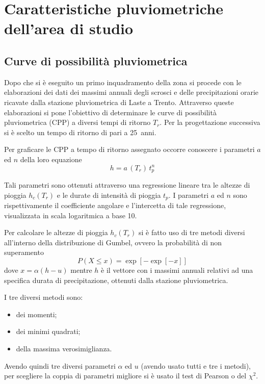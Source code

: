 \chapter{Caratteristiche pluviometriche dell’area di studio}\label{cap:pluviometriche}
\section{Curve di possibilità pluviometrica}
Dopo che si è eseguito un primo inquadramento della zona si procede con le elaborazioni dei dati dei massimi annuali degli scrosci e delle precipitazioni orarie ricavate dalla stazione pluviometrica di Laste a Trento.
Attraverso queste elaborazioni si pone l'obiettivo di determinare le curve di possibilità pluviometrica (CPP) a diversi tempi di ritorno $T_r$.
Per la progettazione successiva si è scelto un tempo di ritorno di pari a \SI{25}{anni}. 

Per graficare le CPP a tempo di ritorno assegnato occorre conoscere i parametri $a$ ed $n$ della loro equazione
\begin{equation}
    \label{eq:CPP}
    h = a\,(T_r) \, t_p ^{n}
\end{equation}

Tali parametri sono ottenuti attraverso una regressione lineare tra le altezze di pioggia $h_c (T_r)$ e le durate di intensità di pioggia $t_p$. 
I parametri $a$ ed $n$ sono rispettivamente il coefficiente angolare e l'intercetta di tale regressione, visualizzata in scala logaritmica a base 10. 

Per calcolare le altezze di pioggia $h_c (T_r)$ si è fatto uso di tre metodi diversi all'interno della distribuzione di Gumbel, ovvero la probabilità di non superamento 
\begin{equation}
  P(X\leq x) = \exp{\left[-\exp{\left[-x \right]} \right]}
\end{equation}
 dove $x = \alpha ( h - u)$ mentre $h$ è il vettore con i massimi annuali relativi ad una specifica durata di precipitazione, ottenuti dalla stazione pluviometrica.

I tre diversi metodi sono:
\begin{itemize}
\item dei momenti;
\item dei minimi quadrati;
\item della massima verosimiglianza.
\end{itemize}
Avendo quindi tre diversi parametri $\alpha$ ed $u$ (avendo usato tutti e tre i metodi), per scegliere la coppia di parametri migliore si è usato il test di Pearson o del $\chi ^2$.

